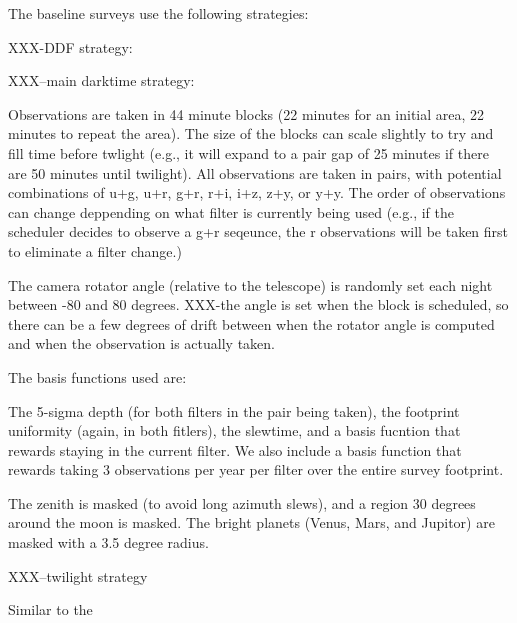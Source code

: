 The baseline surveys use the following strategies:

XXX-DDF strategy:


XXX--main darktime strategy: 

Observations are taken in 44 minute blocks (22 minutes for an initial area, 22 minutes to repeat the area). The size of the blocks can scale slightly to try and fill time before twlight (e.g., it will expand to a pair gap of 25 minutes if there are 50 minutes until twilight). All observations are taken in pairs, with potential combinations of u+g, u+r, g+r, r+i, i+z, z+y, or y+y. The order of observations can change deppending on what filter is currently being used (e.g., if the scheduler decides to observe a g+r seqeunce, the r observations will be taken first to eliminate a filter change.)

The camera rotator angle (relative to the telescope) is randomly set each night between -80 and 80 degrees.  XXX-the angle is set when the block is scheduled, so there can be a few degrees of drift between when the rotator angle is computed and when the observation is actually taken.

The basis functions used are:

The 5-sigma depth (for both filters in the pair being taken), the footprint uniformity (again, in both fitlers), the slewtime, and a basis fucntion that rewards staying in the current filter.  We also include a basis function that rewards taking 3 observations per year per filter over the entire survey footprint.  

The zenith is masked (to avoid long azimuth slews), and a region 30 degrees around the moon is masked. The bright planets (Venus, Mars, and Jupitor) are masked with a 3.5 degree radius. 




XXX--twilight strategy

Similar to the 